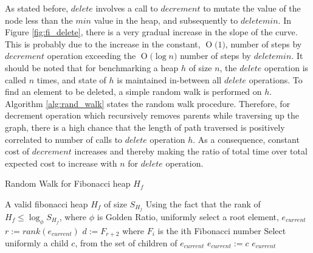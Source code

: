 \documentclass{llncs}
\newcommand{\BigO}[1]{\ensuremath{\operatorname{O}\bigl(#1\bigr)}}
\begin{document}
As stated before, $delete$ involves a call to $decrement$ to mutate the value of the node less than the $min$ value in the heap, and subsequently to $deletemin$. In Figure \ref{fig:fi_delete}, there is a very gradual increase in the slope of the curve. This is probably due to the increase in the constant, \BigO{1}, number of steps by $decrement$ operation exceeding the \BigO{\log n} number of steps by $deletemin$. It should be noted that for benchmarking a heap $h$ of size $n$, the $delete$ operation is called $n$ times, and state of $h$ is maintained in-between all $delete$ operations. To find an element to be deleted, a simple random walk is performed on $h$. Algorithm \ref{alg:rand_walk} states the random walk procedure. Therefore, for decrement operation which recursively removes parents while traversing up the graph, there is a high chance that the length of path traversed is positively correlated to number of calls to $delete$ operation $h$. As a consequence, constant cost of $decrement$ increases and thereby making the ratio of total time over total expected cost to increase with $n$ for $delete$ operation.

\begin{algorithm}[!ht]
	\caption{Random Walk for Fibonacci heap $H_f$}
	\label{alg:rand_walk}
	\begin{algorithmic}[1]
		\REQUIRE A valid fibonacci heap $H_f$ of size $S_{H_f}$
		\STATE Using the fact that the rank of $H_f \le \log_{\phi}S_{H_f}$, where $\phi$ is Golden Ratio\cite{dunlap1997golden}, uniformly select a root element, $e_{current}$
		\STATE $r:=rank(e_{current})$ 
		\STATE $d:=F_{r+2}$ where $F_i$ is the ith Fibonacci number
		\STATE Select uniformly a child $c$, from the set of children of $e_{current}$
		\STATE $e_{current}:=c$
		\ENDWHILE
		\RETURN $e_{current}$
	\end{algorithmic}
\end{algorithm}
\end{document}
